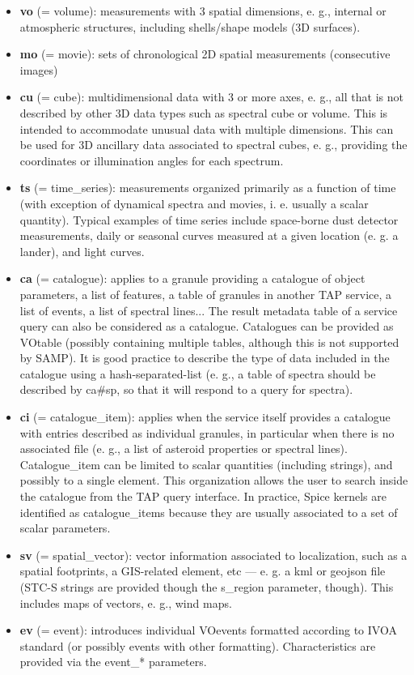 \documentclass[11pt,a4paper]{ivoa}
\begin{document}
\begin{itemize}
\item \textbf{vo }(= volume): measurements with 3 spatial dimensions, e. g., internal or atmospheric structures, including shells/shape models (3D surfaces).
\item \textbf{mo }(= movie): sets of chronological 2D spatial measurements (consecutive images)
\item \textbf{cu }(= cube): multidimensional data with 3 or more axes, e. g., all that is not described by other 3D data types such as spectral cube or volume. This is intended to accommodate unusual data with multiple dimensions. This can be used for 3D ancillary data associated to spectral cubes, e. g., providing the coordinates or illumination angles for each spectrum.
\item \textbf{ts }(= time\_series): measurements organized primarily as a function of time (with exception of dynamical spectra and movies, i. e. usually a scalar quantity). Typical examples of time series include space-borne dust detector measurements, daily or seasonal curves measured at a given location (e. g. a lander), and light curves.
\item \textbf{ca }(= catalogue): applies to a granule providing a catalogue of object parameters, a list of features, a table of granules in another TAP service, a list of events, a list of spectral lines... The result metadata table of a service query can also be considered as a catalogue. Catalogues can be provided as VOtable (possibly containing multiple tables, although this is not supported by SAMP). It is good practice to describe the type of data included in the catalogue using a hash-separated-list (e. g., a table of spectra should be described by ca\#sp, so that it will respond to a query for spectra).
\item \textbf{ci }(= catalogue\_item): applies when the service itself provides a catalogue with entries described as individual granules, in particular when there is no associated file (e. g., a list of asteroid properties or spectral lines). Catalogue\_item can be limited to scalar quantities (including strings), and possibly to a single element. This organization allows the user to search inside the catalogue from the TAP query interface. In practice, Spice kernels are identified as catalogue\_items because they are usually associated to a set of scalar parameters.
\item \textbf{sv} (= spatial\_vector): vector information associated to localization, such as a spatial footprints, a GIS-related element, etc —  e. g. a kml or geojson file (STC-S strings are provided though the s\_region parameter, though). This includes maps of vectors, e. g., wind maps.
\item \textbf{ev} (= event): introduces individual VOevents formatted according to IVOA standard (or possibly events with other formatting). Characteristics are provided via the event\_* parameters.
\end{itemize}
\end{document}
